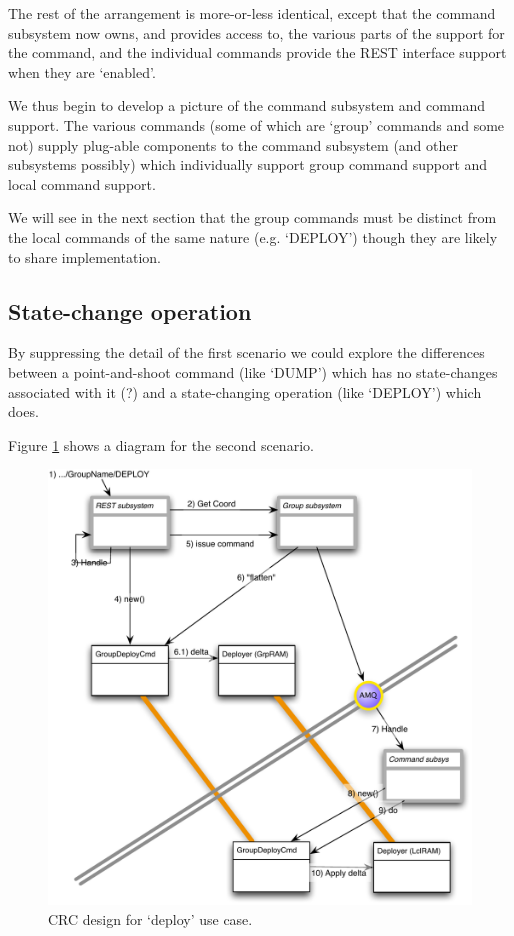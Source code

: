 \documentclass[a4paper,12pt]{article}
\begin{document}
The rest of the arrangement is more-or-less identical, except that the command subsystem now owns, and provides access to, the various parts of the support for the command, and the individual commands provide the REST interface support when they are `enabled'.

We thus begin to develop a picture of the command subsystem and command support. The various commands (some of which are `group' commands and some not) supply plug-able components to the command subsystem (and other subsystems possibly) which individually support group command support and local command support.

We will see in the next section that the group commands must be distinct from the local commands of the same nature (e.g. `DEPLOY') though they are likely to share implementation.

\subsection{State-change operation}
By suppressing the detail of the first scenario we could explore the differences between a point-and-shoot command (like `DUMP') which has no state-changes associated with it (?) and a state-changing operation (like `DEPLOY') which does.

Figure \ref{fig:groupdesign003} shows a diagram for the second scenario.
\begin{figure}[h]
\centering
\includegraphics*[scale=0.7]{GroupDesign003.pdf}
\caption{CRC design for `deploy' use case.}
\label{fig:groupdesign003}
\end{figure}
\end{document}
